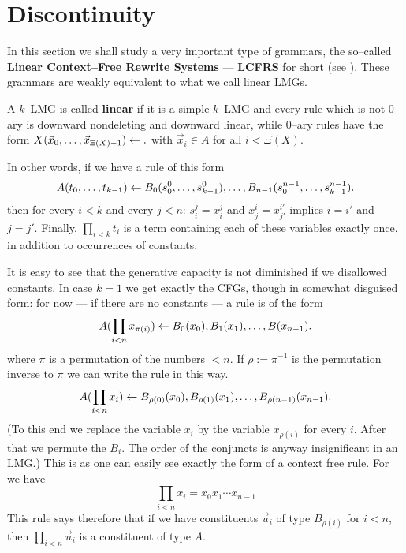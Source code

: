 \section{Discontinuity}
\label{kap4-4}
%
%
%
In this section we shall study a very important type of grammars,
the so--called \textbf{Linear Context--Free Rewrite Systems} --- {\bf
LCFRS} for short  (see \cite{vijay-weir-joshi:LCFRS}). These 
grammars are weakly equivalent to what we call linear LMGs.  
\begin{defn}
A $k$--LMG is called \textbf{linear} if it is a simple
$k$--LMG and every rule which is not 0--ary is downward
nondeleting and downward linear, while 0--ary rules have
the form $X(\vec{x}_0, \dotsc, \vec{x}_{\Xi(X)-1}) 
\leftarrow .$ with $\vec{x}_i \in A$ for all $i < \Xi(X)$.
\end{defn}
In other words, if we have a rule of this form
\begin{equation}
A(t_0, \dotsc, t_{k-1}) \leftarrow
B_0(s_0^0, \dotsc, s^0_{k-1}), 
\dotsc, B_{n-1}(s_0^{n-1}, \dotsc, s_{k-1}^{n-1}).
\end{equation}
then for every $i < k$ and every $j < n$: $s_i^j = x_i^j$ 
and $x^i_j = x^{i'}_{j'}$ implies $i = i'$ and $j = j'$. 
Finally, $\prod_{i < k} t_i$ is a term containing each of these 
variables exactly once, in addition to occurrences of constants.

It is easy to see that the generative capacity is not diminished 
if we disallowed constants. In case $k = 1$ we get exactly the 
CFGs, though in somewhat disguised form: for now 
--- if there are no constants --- a rule is of the form
\begin{equation}
A(\prod_{i < n} x_{\pi(i)}) \leftarrow
B_0(x_0), B_1(x_1), \dotsc, B(x_{n-1}).
\end{equation}
where $\pi$ is a permutation of the numbers $< n$. If $\rho
:= \pi^{-1}$ is the permutation inverse to $\pi$ we can
write the rule in this way.
\begin{equation}
A(\prod_{i < n} x_i) \leftarrow
B_{\rho(0)}(x_0), B_{\rho(1)}(x_1), \dotsc, B_{\rho(n-1)}(x_{n-1})
.
\end{equation}
(To this end we replace the variable $x_i$ by the variable
$x_{\rho(i)}$ for every $i$. After that we permute the
$B_i$. The order of the conjuncts is anyway insignificant 
in an LMG.) This is as one can easily see exactly the form of
a context free rule. For we have
\begin{equation}
\prod_{i< n} x_i = x_0x_1 \dotsb x_{n-1} 
\end{equation}
This rule says therefore that if we have constituents
$\vec{u}_i$ of type $B_{\rho(i)}$ for $i < n$, then
$\prod_{i < n} \vec{u}_i$ is a constituent of type $A$.

